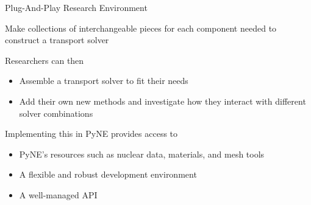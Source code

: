 \documentclass[xcolor=x11names,compress]{beamer}
\renewcommand{\(}{\begin{columns}}
\renewcommand{\)}{\end{columns}}
\newcommand{\<}[1]{\begin{column}{#1}}
\renewcommand{\>}{\end{column}}
\begin{document}
\begin{frame}{Plug-And-Play Research Environment}

    Make collections of \textcolor{dgreen}{interchangeable pieces} for each component
    needed to construct a transport solver
    
    \vspace*{1em}
    Researchers can then 
    \begin{itemize}
    \item \textcolor{dgreen}{Assemble} a transport solver to fit their needs
    \item \textcolor{dgreen}{Add} their own new methods and investigate how 
    they interact with different solver combinations
    \end{itemize}

    \vspace*{1em}
    Implementing this in PyNE provides access to 
    \begin{itemize}
    \item PyNE's \textcolor{dgreen}{resources} such as nuclear data, materials, 
    and mesh tools  
    \item A flexible and robust \textcolor{dgreen}{development environment} 
    \item A well-managed \textcolor{dgreen}{API}
    \end{itemize}

\end{frame}
\end{document}
